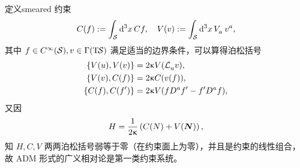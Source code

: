 
		定义smeared 约束
		\begin{equation}
			C(f) \definedby \int_{\spc} \dd[3]{x} C f  \qc V ({v}) \definedby \int_{\spc} \dd[3]{x} \tensor{V}{_a} \tensor{v}{^a},
		\end{equation}
		其中 $f\in C^\infty(\mathcal{S}), v\in \Gamma(\mathrm{T}_{{}}\!{\mathcal{S}})$ 满足适当的边界条件，可以算得泊松括号
		\begin{equation}
			\begin{split}
				\left\{ V({u}), V({v}) \right\} &= 2\gkappa V(\Ld{{u}} {v}),\\
				\left\{ V({v}), C(f) \right\} &= 2\gkappa C(v(f)),\\
				\left\{ C(f), C(f') \right\} &= 2\gkappa V(f\tensor{D}{^a}f'-f' \tensor{D}{^a}f),
			\end{split}
		\end{equation}
		又因
		\begin{equation}
			H = \frac{1}{2\upkappa} \left( C(N) + V(\vb*{N}) \right),
		\end{equation}
		知 $H,C,V$ 两两泊松括号弱等于零（在约束面上为零），并且是约束的线性组合，故 ADM 形式的广义相对论是第一类约束系统。


